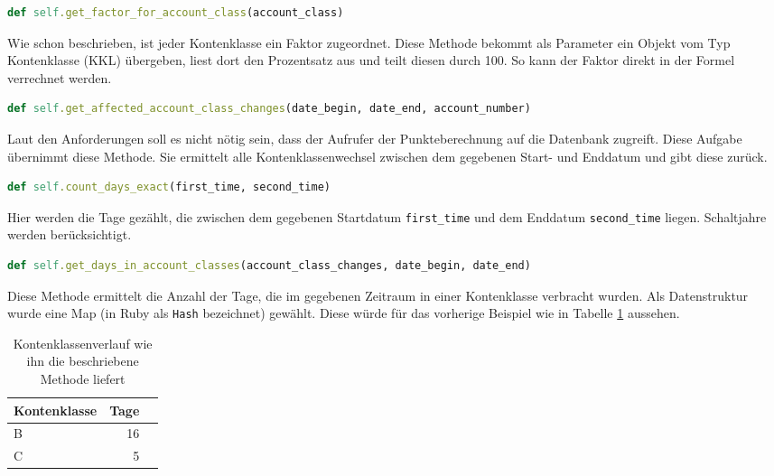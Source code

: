 \documentclass[12pt]{scrreprt}
\begin{document}
\begin{lstlisting}[language=Ruby]
def self.get_factor_for_account_class(account_class) 
\end{lstlisting}
Wie schon beschrieben, ist jeder Kontenklasse ein Faktor zugeordnet. Diese Methode bekommt als Parameter ein Objekt vom Typ Kontenklasse (KKL) übergeben, liest dort den Prozentsatz aus und teilt diesen durch 100. So kann der Faktor direkt in der Formel verrechnet werden. \\

\begin{lstlisting}[language=Ruby]
def self.get_affected_account_class_changes(date_begin, date_end, account_number)
\end{lstlisting}
Laut den Anforderungen soll es nicht nötig sein, dass der Aufrufer der Punkteberechnung auf die Datenbank zugreift. Diese Aufgabe übernimmt diese Methode. Sie ermittelt alle Kontenklassenwechsel zwischen dem gegebenen Start- und Enddatum und gibt diese zurück. \\

\begin{lstlisting}[language=Ruby]
def self.count_days_exact(first_time, second_time)
\end{lstlisting}
Hier werden die Tage gezählt, die zwischen dem gegebenen Startdatum \verb+first_time+ und dem Enddatum \verb+second_time+ liegen. Schaltjahre werden berücksichtigt.\\

\begin{lstlisting}[language=Ruby]
def self.get_days_in_account_classes(account_class_changes, date_begin, date_end)
\end{lstlisting}
Diese Methode ermittelt die Anzahl der Tage, die im gegebenen Zeitraum in einer Kontenklasse verbracht wurden. Als Datenstruktur wurde eine Map (in Ruby als \verb+Hash+ bezeichnet) gewählt. Diese würde für das vorherige Beispiel wie in Tabelle \ref{exkklv} aussehen. \\

\begin{table}
  \begin{center}
    \begin{tabular}{|l|r|r|}
      \hline
      \textbf{Kontenklasse} & \textbf{Tage}\\
      \hline
      B & 16\\
      \hline
      C & 5\\
      \hline
    \end{tabular}
    \caption{Kontenklassenverlauf wie ihn die beschriebene Methode liefert}
    \label{exkklv}
  \end{center}
\end{table}
\vspace{2mm}
\end{document}
